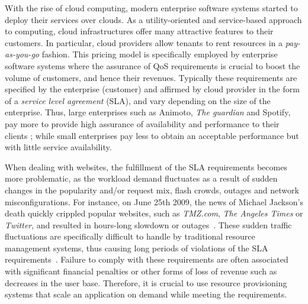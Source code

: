 With the rise of cloud computing, modern enterprise software systems started to deploy their services over clouds. As a utility-oriented and service-based approach to computing, cloud infrastructures offer many attractive features to their customers.  In particular, cloud providers allow tenants to rent resources in a \emph{pay-as-you-go} fashion. This pricing model is specifically employed by enterprise software systems where the assurance of QoS requirements is crucial to boost the volume of customers, and hence their revenues. Typically these requirements are specified by the enterprise (customer) and affirmed by cloud provider in the form of a \emph{service level agreement} (SLA), and vary depending on the size of the enterprise. Thus, large enterprises such as Animoto, \emph{The guardian} and Spotify, pay more to provide high assurance of availability and performance to their clients \cite{casestudiescloud}; while small enterprises pay less to obtain an acceptable performance but with little service availability. 



When dealing with websites, the fulfillment of the SLA requirements becomes more problematic, as the workload demand fluctuates as a result of sudden changes in the popularity and/or request mix, flash crowds, outages and network misconfigurations.
For instance, on June 25th 2009, the news of Michael Jackson's death quickly crippled popular websites, such as \emph{TMZ.com}, \emph{The Angeles Times} or \emph{Twitter}, and resulted in hours-long slowdown or outages~\cite{outagesTimes}. These sudden traffic fluctuations are specifically difficult to handle by traditional resource management systems, thus causing long periods of violations of the SLA requirements~\cite{trafficCongestion}. Failure to comply with these requirements are often associated with significant financial penalties or other forms of loss of revenue such as decreases in the user base. 
Therefore, it is crucial to use resource provisioning systems that scale an application on demand while meeting the requirements.

